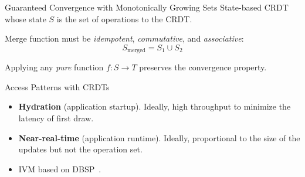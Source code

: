 \documentclass[USenglish,aspectratio=169]{beamer} %
\begin{document}
\begin{frame}{Guaranteed Convergence with Monotonically Growing Sets}
    State-based \acs{CRDT} whose state \(S\) is the set of operations to the \ac{CRDT}.

    Merge function must be \emph{idempotent}, \emph{commutative}, and \emph{associative}:
    \pause
    \[ S_{\text{merged}} = S_1 \cup S_2 \]

    \pause
    Applying any \emph{pure} function \(f: S \to T\) preserves the convergence property.
\end{frame}

\begin{frame}
    \begin{itemize}
    \end{itemize}
\end{frame}

\begin{frame}{Access Patterns with \acsp{CRDT}}
    \begin{itemize}
        \item \textbf{Hydration} (application startup). \newline
              \pause
              Ideally, high throughput to minimize the latency of first draw.
        \pause
        \item \textbf{Near-real-time} (application runtime). \newline
              \pause
              Ideally, proportional to the size of the updates but
              not the operation set.
        \pause
        \item[\(\Rightarrow\)] \acf{IVM} based on DBSP~\cite{budiu2025dbsp,budiu2024dbsp}.
    \end{itemize}
\end{frame}
\end{document}
